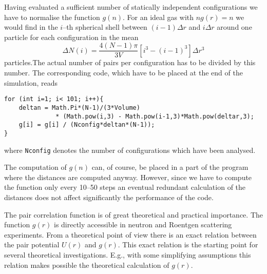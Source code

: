Having evaluated a sufficient number of statically independent configurations 
we have to normalise the function $g(n)$. For an ideal gas with
$ng(r) = n$ we would find in the $i$--th spherical shell
between $(i-1)\Delta r$ and $i \Delta r$ around one particle
for each configuration in the mean
\begin{displaymath}
  \Delta N(i) = \frac{4(N-1)\pi}{3V}
            [i^3 - (i-1)^3] \Delta r^3
\end{displaymath}
particles.The actual number of pairs per configuration has to be divided by
this number. The corresponding code, which have to be placed at the end of the
simulation,  reads
\begin{verbatim}
for (int i=1; i< 101; i++){
    deltan = Math.Pi*(N-1)/(3*Volume)
              * (Math.pow(i,3) - Math.pow(i-1,3)*Math.pow(deltar,3);
    g[i] = g[i] / (Nconfig*deltan*(N-1)); 
}
\end{verbatim}
where \verb|Nconfig| denotes the number of configurations which have been
analysed. 

The computation of $g(n)$ can, of course, be placed in a part of the
program where the distances are computed anyway. However, since we have to
compute the function only every 10--50 steps an eventual redundant 
calculation of the distances does
not affect significantly the performance of the code.

The pair correlation function is of great theoretical and practical
importance. The function $g(r)$ is directly accessible in neutron and Roentgen
scattering experiments. From a theoretical point of view there is an exact
relation between the pair potential $U(r)$ and $g(r)$. 
This exact relation is the starting point for several theoretical
investigations. E.g., with some simplifying
assumptions  this relation makes possible the  theoretical calculation of
$g(r)$. 

